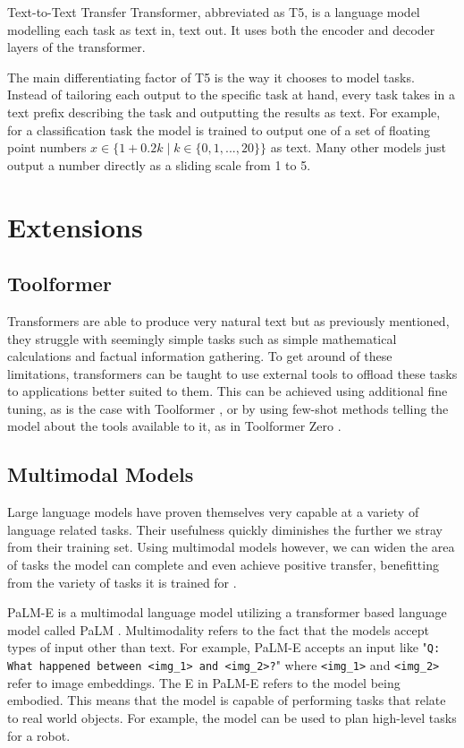 \documentclass[twoside]{article}
\begin{document}
Text-to-Text Transfer Transformer, abbreviated as T5, is a language model modelling each
task as text in, text out. It uses both the encoder and decoder layers of the transformer.
\cite{raffel_exploring_2020}

The main differentiating factor of T5 is the way it chooses to model tasks. Instead of 
tailoring each output to the specific task at hand, every task takes in a text prefix
describing the task and outputting the results as text. For example, for a classification
task the model is trained to output one of a set of floating point numbers 
$x \in \{ 1+0.2k \mid k \in \{ 0, 1, ..., 20\} \}$ as text. Many other models just 
output a number directly as a sliding scale from 1 to 5. 

\section{Extensions}

\subsection{Toolformer}
Transformers are able to produce very natural text but as previously mentioned, they struggle with seemingly
simple tasks such as simple mathematical calculations and factual information gathering.
To get around of these limitations, transformers can be taught to use external tools
to offload these tasks to applications better suited to them. \cite{schick_toolformer_2023} 
This can be achieved using additional fine tuning, as is the case with Toolformer
\cite{schick_toolformer_2023}, or by using few-shot methods telling the model 
about the tools available to it, as in Toolformer Zero \cite{minosvasilias_markus_toolformer_2023}.

\subsection{Multimodal Models}
Large language models have proven themselves very capable at a variety of language related
tasks. Their usefulness quickly diminishes the further we stray from their training set.
Using multimodal models however, we can widen the area of tasks the model
can complete and even achieve positive transfer, benefitting from the variety of tasks
it is trained for \cite{driess_palm-e_2023}. 

PaLM-E is a multimodal language model utilizing a transformer based language model called
PaLM \cite{chowdhery_palm_2022,driess_palm-e_2023}. Multimodality refers to the fact that
the models accept types of input other than text. For example, PaLM-E accepts an input like
"\texttt{Q: What happened between <img\_1> and <img\_2>?}" \cite{driess_palm-e_2023} where
\texttt{<img\_1>} and \texttt{<img\_2>} refer to image embeddings. The E in PaLM-E refers to
the model being embodied. This means that the model is capable of performing tasks that
relate to real world objects. For example, the model can be used to plan high-level tasks
for a robot. \cite{driess_palm-e_2023}
\end{document}
